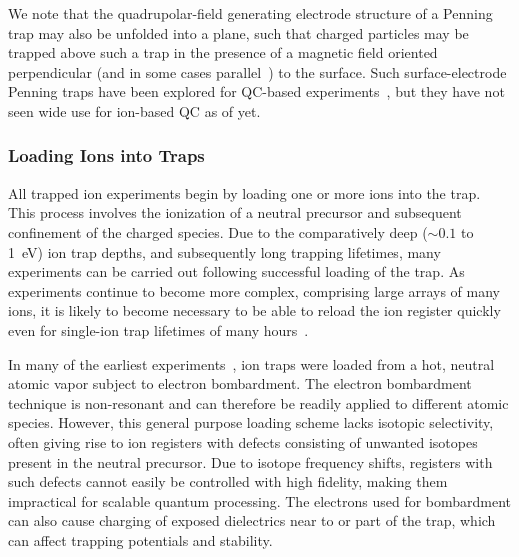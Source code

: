 \documentclass[%
12pt,
 amsmath,amssymb,
]{revtex4-2}
\begin{document}
We note that the quadrupolar-field generating electrode structure of a Penning trap may also be unfolded into a plane, such that charged particles may be trapped above such a trap in the presence of a magnetic field oriented perpendicular (and in some cases parallel~\cite{verdu_2011}) to the surface.  Such surface-electrode Penning traps have been explored for QC-based experiments~\cite{Stahl2005,planar_penning_designs_2010,PhysRevA.81.052335_2010}, but they have not seen wide use for ion-based QC as of yet.

\subsubsection{Loading Ions into Traps}
All trapped ion experiments begin by loading one or more ions into the trap. This process involves the ionization of a neutral precursor and subsequent confinement of the charged species. Due to the comparatively deep (${\sim}0.1$ to 1~eV) ion trap depths, and subsequently long trapping lifetimes, many experiments can be carried out following successful loading of the trap. As experiments continue to become more complex, comprising large arrays of many ions, it is likely to become necessary to be able to reload the ion register quickly even for single-ion trap lifetimes of many hours~\cite{BruzewiczArrayLoading2016}.

In many of the earliest experiments~\cite{NeuhauserTrappedIon1980,raizen1992ionic}, ion traps were loaded from a hot, neutral atomic vapor subject to electron bombardment. The electron bombardment technique is non-resonant and can therefore be readily applied to different atomic species. However, this general purpose loading scheme lacks isotopic selectivity, often giving rise to ion registers with defects consisting of unwanted isotopes present in the neutral precursor. Due to isotope frequency shifts, registers with such defects cannot easily be controlled with high fidelity, making them impractical for scalable quantum processing. The electrons used for bombardment can also cause charging of exposed dielectrics near to or part of the trap, which can affect trapping potentials and stability.
\end{document}

